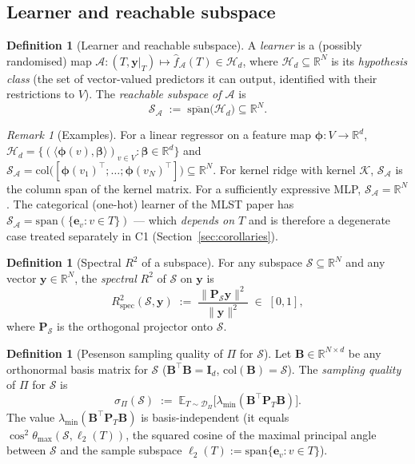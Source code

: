 \documentclass[11pt,a4paper]{article}
\theoremstyle{plain}
\theoremstyle{definition}
\newtheorem{definition}[theorem]{Definition}
\theoremstyle{remark}
\newtheorem{remark}[theorem]{Remark}
\newcommand{\bphi}{\boldsymbol{\phi}}
\newcommand{\by}{\mathbf{y}}
\newcommand{\bP}{\mathbf{P}}
\newcommand{\bB}{\mathbf{B}}
\newcommand{\bI}{\mathbf{I}}
\newcommand{\E}{\mathbb{E}}
\newcommand{\R}{\mathbb{R}}
\newcommand{\Rspec}{R^2_{\mathrm{spec}}}
\newcommand{\Scal}{\mathcal{S}}
\newcommand{\Acal}{\mathcal{A}}
\newcommand{\Hcal}{\mathcal{H}}
\newcommand{\Dcal}{\mathcal{D}}
\begin{document}
\subsection{Learner and reachable subspace}

\begin{definition}[Learner and reachable subspace]
\label{def:learner}
A \emph{learner} is a (possibly randomised) map $\Acal : (T, \by|_T)
\mapsto \hat f_\Acal(T) \in \Hcal_d$, where $\Hcal_d \subseteq \R^N$ is
its \emph{hypothesis class} (the set of vector-valued predictors it can
output, identified with their restrictions to $V$).  The \emph{reachable
subspace of $\Acal$} is
\begin{equation}
    \Scal_\Acal \;:=\; \overline{\mathrm{span}}\big(\Hcal_d\big) \subseteq \R^N.
    \label{eq:reach-defn}
\end{equation}
\end{definition}

\begin{remark}[Examples]
\label{rem:examples}
For a linear regressor on a feature map $\bphi: V \to \R^d$,
$\Hcal_d = \{(\langle \bphi(v), \bm{\beta}\rangle)_{v \in V} : \bm{\beta} \in \R^d\}$ and
$\Scal_\Acal = \mathrm{col}\big([\bphi(v_1)^\top; \ldots; \bphi(v_N)^\top]\big) \subseteq \R^N$.
For kernel ridge with kernel $\mathcal{K}$, $\Scal_\Acal$ is the column
span of the kernel matrix.  For a sufficiently expressive MLP,
$\Scal_\Acal = \R^N$.  The categorical (one-hot) learner of the MLST
paper has $\Scal_\Acal = \mathrm{span}(\{\mathbf{e}_v : v \in T\})$ — which
\emph{depends on $T$} and is therefore a degenerate case treated separately
in C1 (Section~\ref{sec:corollaries}).
\end{remark}

\begin{definition}[Spectral $R^2$ of a subspace]
\label{def:rspec}
For any subspace $\Scal \subseteq \R^N$ and any vector $\by \in \R^N$,
the \emph{spectral} $R^2$ of $\Scal$ on $\by$ is
\begin{equation}
    \Rspec(\Scal, \by) \;:=\; \frac{\|\bP_\Scal \by\|^2}{\|\by\|^2} \;\in\; [0, 1],
    \label{eq:rspec-defn}
\end{equation}
where $\bP_\Scal$ is the orthogonal projector onto $\Scal$.
\end{definition}

\begin{definition}[Pesenson sampling quality of $\Pi$ for $\Scal$]
\label{def:sigma-pi}
Let $\bB \in \R^{N \times d}$ be any orthonormal basis matrix for $\Scal$
($\bB^\top \bB = \bI_d$, $\mathrm{col}(\bB) = \Scal$).  The
\emph{sampling quality} of $\Pi$ for $\Scal$ is
\begin{equation}
    \sigma_\Pi(\Scal) \;:=\;
        \E_{T \sim \Dcal_\Pi}\big[\lambda_{\min}(\bB^\top \bP_T \bB)\big].
    \label{eq:sigma-pi-defn}
\end{equation}
The value $\lambda_{\min}(\bB^\top \bP_T \bB)$ is basis-independent
(it equals $\cos^2 \theta_{\max}(\Scal, \ell_2(T))$, the squared cosine
of the maximal principal angle between $\Scal$ and the sample subspace
$\ell_2(T) := \mathrm{span}\{\mathbf{e}_v : v \in T\}$).
\end{definition}
\end{document}
